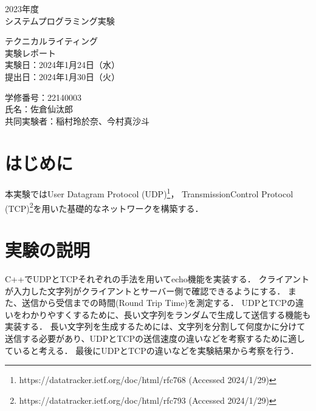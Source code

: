 \documentclass[fleqn, a4paper. 12pt]{ltjsarticle}
\begin{document}
\begin{titlepage}
      \begin{center}
      {
      \Huge 2023年度\\システムプログラミング実験}
      
      \vspace{4cm}
             {\Huge テクニカルライティング\\
               実験レポート\\}
             \vspace{4cm}
                    {\large 実験日：2024年1月24日（水）\\提出日：2024年1月30日（火）\\}
                    
                    {\large 学修番号：22140003\\氏名：佐倉仙汰郎\\ 共同実験者：稲村玲於奈、今村真沙斗}
    \end{center}  
  \end{titlepage}
  
    \section{はじめに}
    本実験ではUser Datagram Protocol (UDP)\footnote{https://datatracker.ietf.org/doc/html/rfc768 (Accessed 2024/1/29)}，
    TransmissionControl Protocol (TCP)\footnote{https://datatracker.ietf.org/doc/html/rfc793 (Accessed 2024/1/29)}を用いた基礎的なネットワークを構築する．
    \section{実験の説明}
    C++でUDPとTCPそれぞれの手法を用いてecho機能を実装する．
    クライアントが入力した文字列がクライアントとサーバー側で確認できるようにする．
    また、送信から受信までの時間(Round Trip Time)を測定する．
    UDPとTCPの違いをわかりやすくするために、長い文字列をランダムで生成して送信する機能も実装する．
    長い文字列を生成するためには、文字列を分割して何度かに分けて送信する必要があり、UDPとTCPの送信速度の違いなどを考察するために適していると考える．
    最後にUDPとTCPの違いなどを実験結果から考察を行う．
\end{document}
